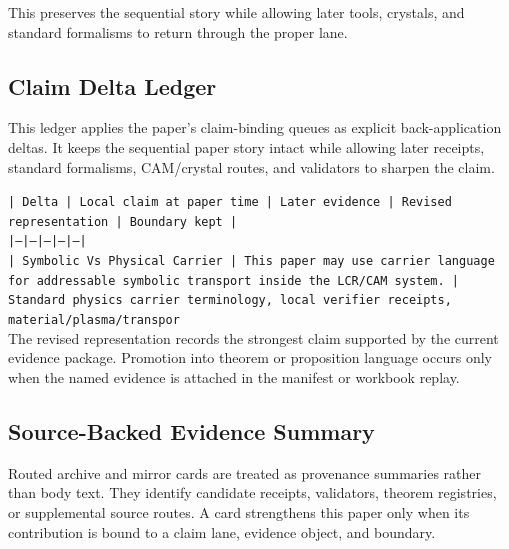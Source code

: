 \documentclass[11pt]{article}
\begin{document}
This preserves the sequential story while allowing later tools, crystals, and
standard formalisms to return through the proper lane.

\subsection*{Claim Delta Ledger}

This ledger applies the paper's claim-binding queues as explicit back-application
deltas. It keeps the sequential paper story intact while allowing later
receipts, standard formalisms, CAM/crystal routes, and validators to sharpen the
claim.

\noindent\texttt{| Delta | Local claim at paper time | Later evidence | Revised representation | Boundary kept |}\\
\noindent\texttt{|---|---|---|---|---|}\\
\noindent\texttt{| Symbolic Vs Physical Carrier | This paper may use carrier language for addressable symbolic transport inside the LCR/CAM system. | Standard physics carrier terminology, local verifier receipts, material/plasma/transpor}\\

The revised representation records the strongest claim supported by the current evidence package. Promotion into theorem or proposition language occurs only when the named evidence is attached in the manifest or workbook replay.

\subsection*{Source-Backed Evidence Summary}

Routed archive and mirror cards are treated as provenance summaries rather than
body text. They identify candidate receipts, validators, theorem registries, or
supplemental source routes. A card strengthens this paper only when its
contribution is bound to a claim lane, evidence object, and boundary.
\end{document}
